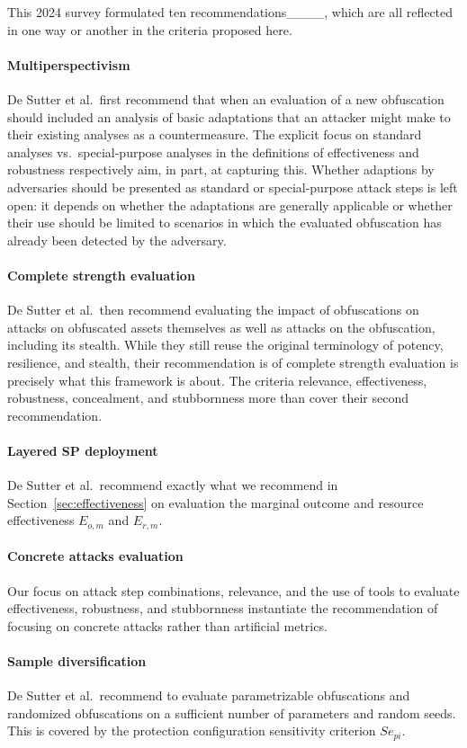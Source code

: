 This 2024 survey formulated ten recommendations____, which are all reflected in one way or another in the criteria proposed here.

\paragraph{Multiperspectivism} De Sutter et al.\ first recommend that when an evaluation of a new obfuscation should included an analysis of basic adaptations that an attacker might make to their existing analyses as a countermeasure. The explicit focus on standard analyses vs.\ special-purpose analyses in the definitions of effectiveness and robustness respectively aim, in part, at capturing this. Whether adaptions by adversaries should be presented as standard or special-purpose attack steps is left open: it depends on whether the adaptations are generally applicable or whether their use should be limited to scenarios in which the evaluated obfuscation has already been detected by the adversary. 
\paragraph{Complete strength evaluation} De Sutter et al.\ then recommend evaluating the impact of obfuscations on attacks on obfuscated assets themselves as well as attacks on the obfuscation, including its stealth. While they still reuse the original terminology of potency, resilience, and stealth, their recommendation is of complete strength evaluation is precisely what this framework is about. The criteria relevance, effectiveness, robustness, concealment, and stubbornness more than cover their second recommendation.  
\paragraph{Layered SP deployment} De Sutter et al.\ recommend exactly what we recommend in Section~\ref{sec:effectiveness} on evaluation the marginal outcome and resource effectiveness $E_{o,m}$ and $E_{r,m}$. 
\paragraph{Concrete attacks evaluation} Our focus on attack step combinations, relevance, and the use of tools to evaluate effectiveness, robustness, and stubbornness instantiate the recommendation of focusing on concrete attacks rather than artificial metrics. 
\paragraph{Sample diversification} De Sutter et al.\ recommend to evaluate parametrizable obfuscations and randomized obfuscations on a sufficient number of parameters and random seeds. This is covered by the protection configuration sensitivity criterion $Se_{pi}$.
